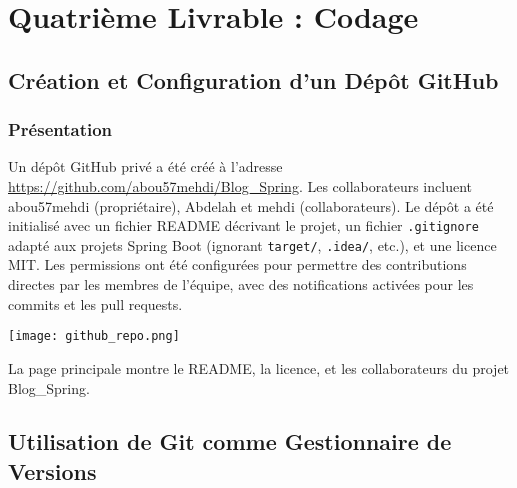 \chapter{Quatrième Livrable : Codage}
\setlength{\parskip}{0.5em}
\setsecheadstyle{\Large\color{accentblue}\sffamily\bfseries\raggedright}
\setsubsecheadstyle{\large\color{accentblue}\sffamily\bfseries\raggedright}
\setlength{\aftersecskip}{1em}
\setlength{\aftersubsecskip}{0.5em}

\section{Création et Configuration d'un Dépôt GitHub}
\subsection{Présentation}
Un dépôt GitHub privé a été créé à l'adresse \url{https://github.com/abou57mehdi/Blog_Spring}. Les collaborateurs incluent abou57mehdi (propriétaire), Abdelah et mehdi (collaborateurs). Le dépôt a été initialisé avec un fichier README décrivant le projet, un fichier \texttt{.gitignore} adapté aux projets Spring Boot (ignorant \texttt{target/}, \texttt{.idea/}, etc.), et une licence MIT. Les permissions ont été configurées pour permettre des contributions directes par les membres de l'équipe, avec des notifications activées pour les commits et les pull requests.

\begin{center}
\begin{minipage}{\textwidth}
  \begin{tcolorbox}[enhanced, colback=lightgray, colframe=accentblue, arc=5pt, boxrule=0.5pt, drop shadow]
    \centering
    \texttt{[image: github\_repo.png]}
    \label{fig:github-repo}
    \vspace{0.5cm}
    \parbox{0.9\textwidth}{\centering La page principale montre le README, la licence, et les collaborateurs du projet Blog\_Spring.}
  \end{tcolorbox}
\end{minipage}
\end{center}

\section{Utilisation de Git comme Gestionnaire de Versions}
